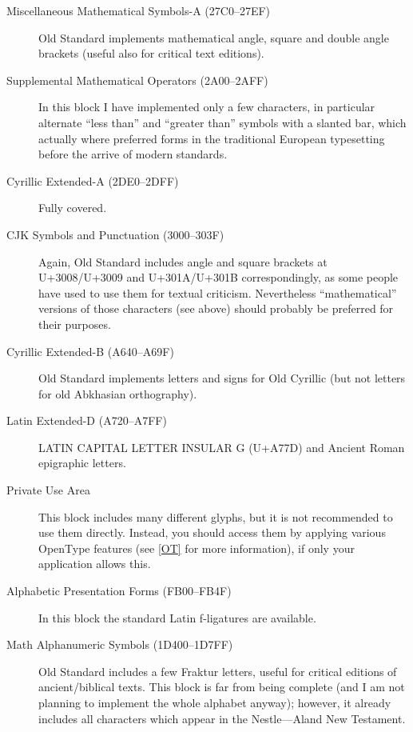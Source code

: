 \documentclass[12pt,a4paper,openany]{book}
\begin{document}
\begin{description}
\item[Miscellaneous Mathematical Symbols-A (27C0–27EF)] Old Standard
implements mathematical angle, square and double angle brackets (useful
also for critical text editions).

\item[Supplemental Mathematical Operators (2A00–2AFF)] In this block I have
implemented only a few characters, in particular alternate “less than” and
“greater than” symbols with a slanted bar, which actually where preferred
forms in the traditional European typesetting before the arrive of modern
standards.

\item[Cyrillic Extended-A (2DE0–2DFF)] Fully covered.

\item[CJK Symbols and Punctuation (3000–303F)] Again, Old Standard includes
angle and square brackets at U+3008/U+3009 and U+301A/U+301B
correspondingly, as some people have used to use them for textual
criticism. Nevertheless “mathematical” versions of those characters (see
above) should probably be preferred for their purposes.

\item[Cyrillic Extended-B (A640–A69F)] Old Standard implements letters and
signs for Old Cyrillic (but not letters for old Abkhasian orthography).

\item[Latin Extended-D (A720–A7FF)] LATIN CAPITAL LETTER INSULAR G (U+A77D)
and Ancient Roman epigraphic letters.

\item[Private Use Area] This block includes many different glyphs, but it
is not recommended to use them directly. Instead, you should access them
by applying various OpenType features (see \autoref{OT} for more
information), if only your application allows this.

\item[Alphabetic Presentation Forms (FB00–FB4F)] In this block the standard
Latin f-ligatures are available.

\item[Math Alphanumeric Symbols (1D400–1D7FF)] Old Standard includes a few
Fraktur letters, useful for critical editions of ancient/biblical texts.
This block is far from being complete (and I am not planning to implement
the whole alphabet anyway); however, it already includes all characters
which appear in the Nestle---Aland New Testament.

\end{description}
\end{document}
